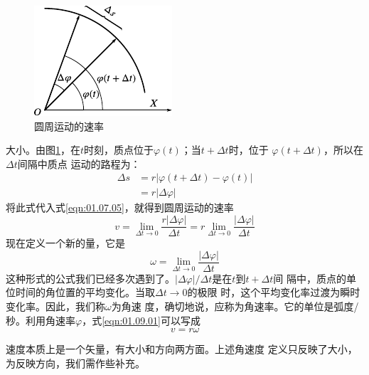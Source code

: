 \begin{figure}
  \vspace{-0.5em}
  \centering \small
  \includegraphics{figure/fig01.18}
  \caption{圆周运动的速率}
  \label{fig:01.18}
\end{figure}
\noindent 大小。由图\ref{fig:01.18}，在$t$时刻，质点位于$\varphi\left(t\right)$；当$t+\Delta t$时，位于
$\varphi\left(t+\Delta t\right)$，所以在$\Delta t$间隔中质点
运动的路程为：
\setlength{\mathindent}{2em}
\begin{equation*}
  \begin{aligned}
    \Delta s & =r|\varphi\left(t+\Delta t\right)-\varphi\left(t\right)| \\
             & =r|\Delta \varphi|
  \end{aligned}
\end{equation*}
将此式代入式\eqref{eqn:01.07.05}，就得到圆周运动的速率
\setlength{\mathindent}{6em}
\begin{equation}\label{eqn:01.09.01}
  v=\lim _{\Delta t \rightarrow 0} \frac{r|\Delta \varphi|}{\Delta t}=r \lim _{\Delta t \rightarrow 0} \frac{|\Delta \varphi|}{\Delta t}
\end{equation}
现在定义一个新的量，它是
\begin{equation}\label{eqn:01.09.02}
  \omega=\lim _{\Delta t \rightarrow 0} \frac{|\Delta \varphi|}{\Delta t}
\end{equation}
这种形式的公式我们已经多次遇到了。$|\Delta\varphi|/\Delta t$是在$t$到$t+\Delta t$间
隔中，质点的单位时间的角位置的平均变化。当取$\Delta t\rightarrow 0$的极限
时，这个平均变化率过渡为瞬时变化率。因此，我们称$\omega$为角速
度，确切地说，应称为角速率。它的单位是弧度/秒。利用角速率$\varphi$，式\eqref{eqn:01.09.01}可以写成
\begin{equation}\label{eqn:01.09.03}
  v=r\omega
\end{equation}

速度本质上是一个矢量，有大小和方向两方面。上述角速度
定义只反映了大小，为反映方向，我们需作些补充。

